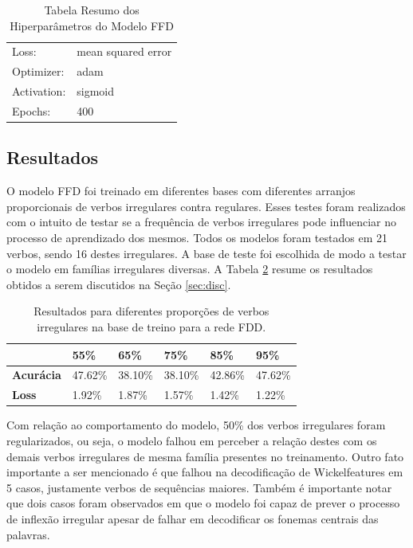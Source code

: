 \begin{table}[H]
\centering
\begin{tabular}{ll}
Loss: & mean squared error \\
Optimizer: & adam \\
Activation: & sigmoid \\
Epochs: & 400 \\
\end{tabular}
\caption{Tabela Resumo dos Hiperparâmetros do Modelo FFD}
\label{tab:resumo1}
\end{table}

\subsection{Resultados}

O modelo FFD foi treinado em diferentes bases com diferentes arranjos proporcionais de verbos irregulares contra regulares. Esses testes foram realizados com o intuito de testar se a frequência de verbos irregulares pode influenciar no processo de aprendizado dos mesmos. Todos os modelos foram testados em 21 verbos, sendo 16 destes irregulares. A base de teste foi escolhida de modo a testar o modelo em famílias irregulares diversas. A Tabela \ref{tab:resultadosfdd} resume os resultados obtidos a serem discutidos na Seção \ref{sec:disc}.

\begin{table}[H]
\centering
\begin{tabular}{llllll}
 & \textbf{55\%} & \textbf{65\%} & \textbf{75\%} & \textbf{85\%} & \textbf{95\%} \\ \hline
\textbf{Acurácia} & 47.62\% & 38.10\% & 38.10\% & 42.86\% & 47.62\% \\
\textbf{Loss} & 1.92\% & 1.87\% & 1.57\% & 1.42\% & 1.22\%
\end{tabular}
\caption{Resultados para diferentes proporções de verbos irregulares na base de treino para a rede FDD.}
\label{tab:resultadosfdd}
\end{table}

Com relação ao comportamento do modelo, 50\% dos verbos irregulares foram regularizados, ou seja, o modelo falhou em perceber a relação destes com os demais verbos irregulares de mesma família presentes no treinamento. Outro fato importante a ser mencionado é que falhou na decodificação de Wickelfeatures em 5 casos, justamente verbos de sequências maiores. Também é importante notar que dois casos foram observados em que o modelo foi capaz de prever o processo de inflexão irregular apesar de falhar em decodificar os fonemas centrais das palavras.

